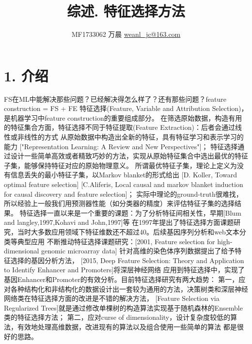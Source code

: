\documentclass[a4paper,UTF8]{article}
\begin{document}


\title{综述. 特征选择方法}
\author{MF1733062 万晨 \url{weanl_jc@163.com}}
\maketitle

\section*{1. 介绍}
  FS在ML中能解决那些问题？已经解决得怎么样了？还有那些问题？feature construction = FS + FE
  特征选择(Feature, Variable and Attribution Selection)，是机器学习中feature construction的重要组成部分。
  在筛选原始数据，构造有用的特征集合方面，特征选择不同于特征提取(Feature Extraction)：后者会通过线性或非线性的方式
  从原始数据中构造出全新的特征，具有特征学习和表示学习的能力
  ["Representation Learning: A Review and New Perspectives"]\cite{DBLP:journals/pami/BengioCV13}；
  特征选择通过设计一些简单高效或者精致巧妙的方法，实现从原始特征集合中选出最优的特征子集，能够保持特征对应的原始物理意义。
  所谓最优特征子集，理论上定义为没有信息丢失的最小特征子集，以Markov blanket的形式给出
  [D. Koller, Toward optimal feature selection]
  [C.Aliferis, Local causal and markov blanket induction for causal discovery and feature selection]；
  实际中理论的ground-truth很难找，所以经验上一般我们用预测器性能（如分类器的精度）来评估特征子集的选择结果。
  特征选择一直以来是一个重要的课题：为了分析特征间相关性，早期[Blum and langley,1997,Kohavi and John,1997]等
  在1997年提出了特征选择方面课题研究，当时大多数应用领域下特征维数还不超过40。后续基因序列分析和web文本分类等典型应用
  不断推动特征选择课题研究：[2001, Feature selection for high-dimensional genomic microarray data]
  针对高维的染色体序列数据提出了给予特征选择的基因分析方法，
  [2015, Deep Feature Selection: Theory and Application to Identify Enhancer and Promoters]将深层神经网络
  应用到特征选择中，实现了基因Enhancer和Promoter的有效分析。目前特征选择研究有两大趋势：
  第一，应对各种结构化和非结构化的数据设计出一套较为通用的方法，决策树类和深层神经网络类在特征选择方面的改进是不错的解决方法，
  [Feature Selection via Regularized Trees]就是通过修改单棵树的构造算法实现基于随机森林的Ensemble类的特征选择方法；
  第二，应对curse of dimensionality，设计复杂度较低的算法，有效地处理高维数据，改进现有的算法以及组合使用一些简单的算法
  都是很好的思路。
\end{document}
